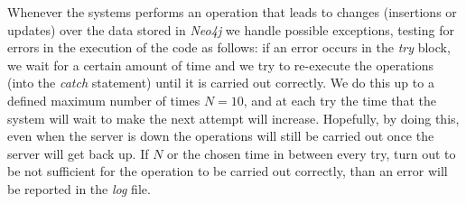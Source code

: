 Whenever the systems performs an operation that leads to changes (insertions or updates) over the data stored in \emph{Neo4j} we handle possible exceptions, testing for errors in the execution of the code as follows: if an error occurs in the \emph{try} block, we wait for a certain amount of time and we try to re-execute the operations (into the \emph{catch} statement) until it is carried out correctly. 
We do this up to a defined maximum number of times $N = 10$, and at each try the time that the system will wait to make the next attempt will increase. Hopefully, by doing this, even when the server is down the operations will still be carried out once the server will get back up. If $N$ or the chosen time in between every try,  turn out to be not sufficient for the operation to be carried out correctly, than an error will be reported in the \emph{log} file.